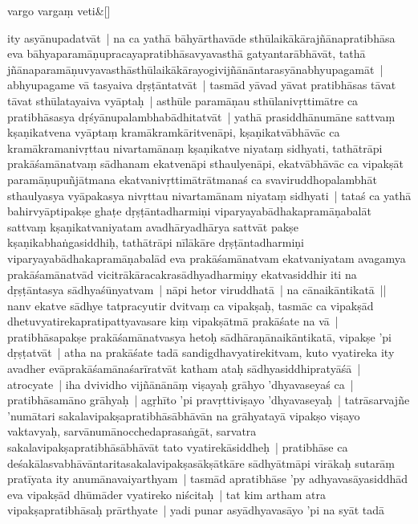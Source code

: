 \documentclass[article,12pt,a4paper]{memoir}%
\newcounter{parCount}
\begin{document}
	    
	    \stanza[\smallbreak]
	  vargo vargaṃ veti\&[\smallbreak]
	  
	  
	  

	  \pstart \leavevmode%
	\label{thakur75-130.19}ity asyānupadatvāt | na ca yathā bāhyārthavāde sthūlaikākārajñānapratibhāsa eva bāhyaparamāṇupracayapratibhāsavyavasthā gatyantarābhāvāt, tathā jñānaparamāṇuvyavasthāsthūlaikākārayogivijñānāntarasyānabhyupagamāt | abhyupagame vā tasyaiva dṛṣṭāntatvāt | tasmād yāvad yāvat pratibhāsas tāvat tāvat sthūlatayaiva vyāptaḥ | asthūle paramāṇau sthūlanivṛttimātre ca pratibhāsasya dṛśyānupalambhabādhitatvāt | yathā prasiddhānumāne sattvaṃ kṣaṇikatvena vyāptaṃ kramākramkāritvenāpi, kṣaṇikatvābhāvāc ca kramākramanivṛttau nivartamānaṃ kṣaṇikatve niyataṃ sidhyati, tathātrāpi prakāśamānatvaṃ sādhanam ekatvenāpi sthaulyenāpi, ekatvābhāvāc ca vipakṣāt paramāṇupuñjātmana ekatvanivṛttimātrātmanaś ca svaviruddhopalambhāt sthaulyasya vyāpakasya nivṛttau nivartamānam  niyataṃ sidhyati | tataś ca yathā bahirvyāptipakṣe ghaṭe dṛṣṭāntadharmiṇi viparyayabādhakapramāṇabalāt sattvaṃ kṣaṇikatvaniyatam avadhārya\label{ratnakīrtinibandhāvali__36r1PF7IMSPU9OV2Y47VRORIBMX}dhārya\label{ratnakīrtinibandhāvali__36r1PF7IMSNVGCLLFHWVZ63NZNW} sattvāt pakṣe kṣaṇikabhaṅgasiddhiḥ, tathātrāpi nīlākāre dṛṣṭāntadharmiṇi viparyayabādhakapramāṇabalād eva prakāśamānatvam ekatvaniyatam avagamya prakāśamānatvād vicitrākāracakrasādhyadharmiṇy ekatvasiddhir iti na dṛṣṭāntasya sādhyaśūnyatvam | nāpi hetor viruddhatā | na cānaikāntikatā || \label{thakur75-130.33} nanv ekatve sādhye tatpracyutir dvitvaṃ ca vipakṣaḥ, tasmāc ca vipakṣād dhetuvyatirekapratipattyavasare kiṃ vipakṣātmā prakāśate na vā | pratibhāsapakṣe prakāśamānatvasya hetoḥ sādhāraṇānaikāntikatā, vipakṣe 'pi dṛṣṭatvāt | atha na prakāśate tadā sandigdhavyatirekitvam, kuto vyatireka ity avadher evāprakāśamānaśarīratvāt katham ataḥ sādhyasiddhipratyāśā | \label{thakur75-131.4} atrocyate | iha dvividho vijñānānāṃ viṣayaḥ grāhyo 'dhyavaseyaś ca | pratibhāsamāno grāhyaḥ | agṛhīto 'pi pravṛttiviṣayo 'dhyavaseyaḥ | tatrāsarvajñe 'numātari sakalavipakṣapratibhāsābhāvān na grāhyatayā vipakṣo viṣayo vaktavyaḥ, sarvānumānocchedaprasaṅgāt, sarvatra sakalavipakṣapratibhāsābhāvāt tato vyatirekāsiddheḥ | pratibhāse ca deśakālasvabhāvāntaritasakalavipakṣasākṣātkāre sādhyātmāpi virākaḥ sutarāṃ pratīyata ity anumānavaiyarthyam | tasmād apratibhāse 'py adhyavasāyasiddhād eva vipakṣād dhūmāder vyatireko niścitaḥ | tat kim artham atra vipakṣapratibhāsaḥ prārthyate | yadi punar asyādhyavasāyo 'pi na syāt tadā 
\end{document}

